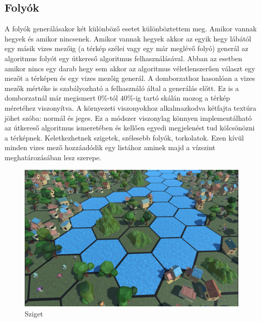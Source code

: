 \subsection{Folyók}

A folyók generálásakor két különböző esetet különböztettem meg. Amikor vannak hegyek és amikor nincsenek. Amikor vannak hegyek akkor az egyik hegy lábától egy másik vizes mezőig (a térkép szélei vagy egy már meglévő folyó) generál az algoritmus folyót egy útkereső algoritmus felhasználásával. Abban az esetben amikor nincs egy darab hegy sem akkor az algoritmus véletlenszerűen választ egy mezőt a térképen és egy vizes mezőig generál. A domborzathoz hasonlóan a vizes mezők mértéke is szabályozható a felhasználó által a generálás előtt. Ez is a domborzatnál már megismert $0\%$-tól $40\%$-ig tartó skálán mozog a térkép méretéhez viszonyítva. A környezeti viszonyokhoz alkalmazkodva kétfajta textúra jöhet szóba: normál és jeges. Ez a módszer viszonylag könnyen implementálható az útkereső algoritmus ismeretében és kellően egyedi megjelenést tud kölcsönözni a térképnek. Keletkezhetnek szigetek, szélesebb folyók, torkolatok. Ezen kívül minden vizes mező hozzáadódik egy listához aminek majd a vízszint meghatározásában lesz szerepe.
\newline
\newline 

\begin{figure}[h]
\centering
\includegraphics[scale=0.3]{kepek/img11_4_3_1.JPG}
\caption{Sziget}
\label{fig:img11_4_3_1}
\end{figure}


